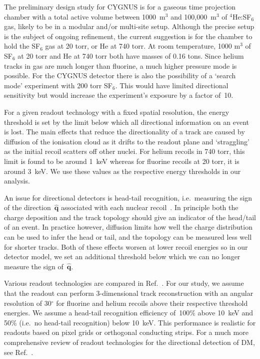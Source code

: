 \documentclass[prd,10pt,twocolumn,showpacs,nofootinbib,aps,superscriptaddress,preprintnumbers]{revtex4-1}
\begin{document}
The preliminary design study for CYGNUS is for a gaseous time projection chamber with a total active volume between 1000~m$^3$ and 100,000~m$^3$
of $^4$He:SF${_6}$ gas, likely to be in a modular and/or multi-site setup. Although the precise setup is the subject of ongoing refinement, the current suggestion is for the chamber to hold the SF$_6$ gas at 20 torr, or He at 740 torr. At room temperature, 1000 m$^3$ of SF$_6$ at 20 torr and He at 740 torr both have masses of 0.16 tons. Since helium tracks in gas are much longer than fluorine, a much higher pressure mode is possible. For the CYGNUS detector there is also the possibility of a `search mode' experiment with 200 torr SF$_6$. This would have limited directional sensitivity but would increase the experiment's exposure by a factor of~10. 

For a given readout technology with a fixed spatial resolution, the energy threshold is set by the limit below which all directional information on an event is lost. The main effects that reduce the directionality of a track are caused by diffusion of the ionisation cloud as it drifts to the readout plane and `straggling' as the initial recoil scatters off other nuclei. For helium recoils in 740 torr, this limit is found to be around 1~keV whereas for fluorine recoils at 20 torr, it is around 3~keV. We use these values as the respective energy thresholds in our analysis. 

An issue for directional detectors is head-tail recognition, i.e.\ measuring the sign of the direction~$\hat{\textbf{q}}$ associated with each nuclear recoil~\cite{Dujmic:2008zz,Majewski:2009an,Billard:2012bk,Battat:2016xaw}. In principle both the charge deposition and the track topology should give an indicator of the head/tail of an event. In practice however, diffusion limits how well the charge distribution can be used to infer the head or tail, and the topology can be measured less well for shorter tracks. Both of these effects worsen at lower recoil energies so in our detector model, we set an additional threshold below which we can no longer measure the sign of~$\hat{\mathbf{q}}$. 

Various readout technologies are compared in Ref.~\cite{CYGNUS}. For our study, we assume that the readout can perform 3-dimensional track reconstruction with an angular resolution of 30$^\circ$ for fluorine and helium recoils above their respective threshold energies. We assume a head-tail recognition efficiency of~100\% above 10~keV and 50\% (i.e.\ no head-tail recognition) below 10~keV. This performance is realistic for readouts based on pixel grids or orthogonal conducting strips. For a much more comprehensive review of readout technologies for the directional detection of DM, see Ref.~\cite{Battat:2016pap}.
\end{document}
